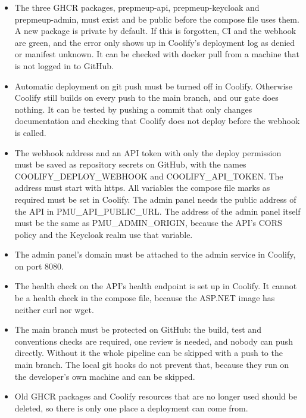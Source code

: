 \documentclass[a4paper,11pt]{article}
\begin{document}
\begin{itemize}
    \item The three GHCR packages, prepmeup-api, prepmeup-keycloak and prepmeup-admin, must exist and be public before the compose file uses them. A new package is private by default. If this is forgotten, CI and the webhook are green, and the error only shows up in Coolify's deployment log as denied or manifest unknown. It can be checked with docker pull from a machine that is not logged in to GitHub.
    \item Automatic deployment on git push must be turned off in Coolify. Otherwise Coolify still builds on every push to the main branch, and our gate does nothing. It can be tested by pushing a commit that only changes documentation and checking that Coolify does not deploy before the webhook is called.
    \item The webhook address and an API token with only the deploy permission must be saved as repository secrets on GitHub, with the names COOLIFY\_DEPLOY\_WEBHOOK and COOLIFY\_API\_TOKEN. The address must start with https. All variables the compose file marks as required must be set in Coolify. The admin panel needs the public address of the API in PMU\_API\_PUBLIC\_URL. The address of the admin panel itself must be the same as PMU\_ADMIN\_ORIGIN, because the API's CORS policy and the Keycloak realm use that variable.
    \item The admin panel's domain must be attached to the admin service in Coolify, on port 8080.
    \item The health check on the API's health endpoint is set up in Coolify. It cannot be a health check in the compose file, because the ASP.NET image has neither curl nor wget.
    \item The main branch must be protected on GitHub: the build, test and conventions checks are required, one review is needed, and nobody can push directly. Without it the whole pipeline can be skipped with a push to the main branch. The local git hooks do not prevent that, because they run on the developer's own machine and can be skipped.
    \item Old GHCR packages and Coolify resources that are no longer used should be deleted, so there is only one place a deployment can come from.
\end{itemize}
\end{document}
